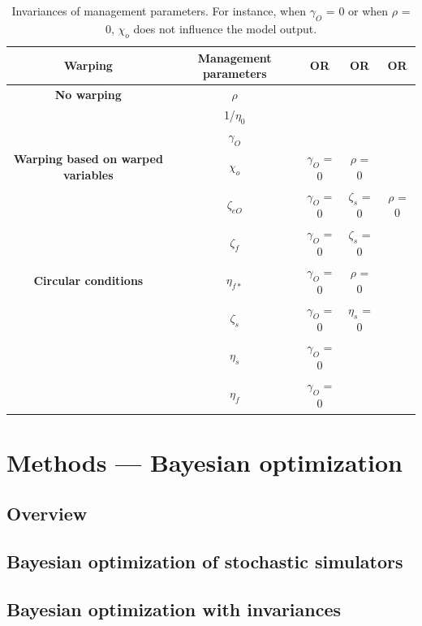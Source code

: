 \begin{table}[htbp]
	\centering
	\caption{Invariances of management parameters. For instance, when  $\gamma_{O}$ = 0 or when $\rho$ = 0, $\chi_{o}$ does not influence the model output. }
	\begin{tabular}{|c|c|c|c|c|}
		\midrule
		\textbf{Warping} & \textbf{Management parameters} & \textbf{OR} & \textbf{OR} & \textbf{OR} \\
		\midrule
		\textbf{No warping} & $\rho$ & & & \\
		\cmidrule{2-5} & 1/$\eta_{0}$ & & & \\
		\cmidrule{2-5} & $\gamma_{O}$ & & & \\
		\midrule
		\textbf{Warping based on warped variables} & $\chi_{o}$ & $\gamma_{O}$ = 0 & $\rho$ = 0 & \\
		\cmidrule{2-5} & $\zeta_{eO}$ & $\gamma_{O}$ = 0 & $\zeta_{s}$ = 0 & $\rho$ = 0\\
		\cmidrule{2-5} & $\zeta_{f}$ & $\gamma_{O}$ = 0 & $\zeta_{s}$ = 0 & \\
		\midrule
		\textbf{Circular conditions} & $\eta_{f*}$ & $\gamma_{O}$ = 0 & $\rho$ = 0 & \\
		\cmidrule{2-5} & $\zeta_{s}$ & $\gamma_{O}$ = 0 & $\eta_{s}$ = 0 & \\
		\cmidrule{2-5} & $\eta_{s}$ & $\gamma_{O}$ = 0 & & \\
		\cmidrule{2-5} & $\eta_{f}$ & $\gamma_{O}$ = 0 & & \\
		\midrule

	\end{tabular}%
	\label{tab:table_invariances_parameters}%
\end{table}%


\section{Methods — Bayesian optimization}\label{sec:bo}

\subsection{Overview}

\subsection{Bayesian optimization of stochastic simulators}

\subsection{Bayesian optimization with invariances}

